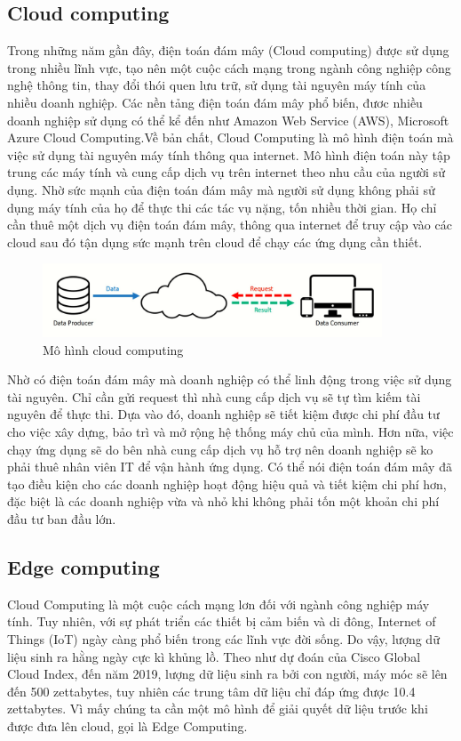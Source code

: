 \documentclass[a4paper]{report}
\begin{document}
\subsection{Cloud computing}	
	Trong những năm gần đây, điện toán đám mây (Cloud computing) được sử dụng trong nhiều lĩnh vực, tạo nên một cuộc cách mạng trong ngành công nghiệp công nghệ thông tin, thay đổi thói quen lưu trữ, sử dụng tài nguyên máy tính của nhiều doanh nghiệp. Các nền tảng điện toán đám mây phổ biến, đươc nhiều doanh nghiệp sử dụng có thể kể đến như Amazon Web Service (AWS), Microsoft Azure Cloud Computing.Về bản chất, Cloud Computing là mô hình điện toán mà việc sử dụng tài nguyên máy tính thông qua internet. Mô hình điện toán này tập trung các máy tính và cung cấp dịch vụ trên internet theo nhu cầu của người sử dụng. Nhờ sức mạnh của điện toán đám mây mà người sử dụng không phải sử dụng máy tính của họ để thực thi các tác vụ nặng, tốn nhiều thời gian. Họ chỉ cần thuê một dịch vụ điện toán đám mây, thông qua internet để truy cập vào các cloud sau đó tận dụng sức mạnh trên cloud để chạy các ứng dụng cần thiết. 	\\
	
\begin{figure}[h]
\centering
\includegraphics[width=0.9\textwidth]{cloud.png}
\caption{\label{fig:2.3333}   Mô hình cloud computing}
\end{figure}


	Nhờ có điện toán đám mây mà doanh nghiệp có thể linh động trong việc sử dụng tài nguyên. Chỉ cần gửi request thì nhà cung cấp dịch vụ sẽ tự tìm kiếm tài nguyên để thực thi.  Dựa vào đó, doanh nghiệp sẽ tiết kiệm được chi phí đầu tư cho việc xây dựng, bảo trì và mở rộng hệ thống máy chủ của mình. Hơn nữa, việc chạy ứng dụng sẽ do bên nhà cung cấp dịch vụ hỗ trợ nên doanh nghiệp sẽ ko phải thuê nhân viên IT để vận hành ứng dụng. Có thể nói điện toán đám mây đã tạo điều kiện cho các doanh nghiệp hoạt động hiệu quả và tiết kiệm chi phí hơn, đặc biệt là các doanh nghiệp vừa và nhỏ khi không phải tốn một khoản chi phí đầu tư ban đầu lớn.
\subsection{Edge computing}
Cloud Computing là một cuộc cách mạng lơn đối với ngành công nghiệp máy tính. Tuy nhiên, với sự phát triển các thiết bị cảm biến và di đông, Internet of Things (IoT) ngày càng phổ biến trong các lĩnh vực đời sống. Do vậy, lượng dữ liệu sinh ra hằng ngày cực kì khủng lồ. Theo như dự đoán của Cisco Global Cloud Index, đến năm 2019, lượng dữ liệu sinh ra bởi con người, máy móc sẽ lên đến 500 zettabytes, tuy nhiên các trung tâm dữ liệu chỉ đáp ứng được 10.4 zettabytes. Vì mấy chúng ta cần một mô hình để giải quyết dữ liệu trước khi được đưa lên cloud, gọi là Edge Computing.
\end{document}
